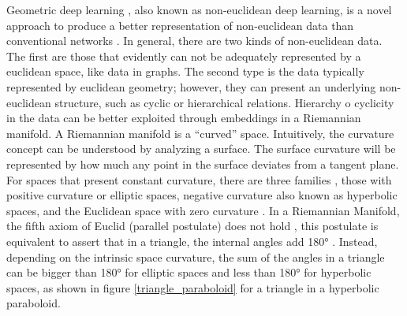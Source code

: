 \documentclass[journal]{IEEEtran}
\begin{document}
Geometric deep learning \cite{gdl}, also known as non-euclidean deep learning, is a novel approach to produce a better representation of non-euclidean data than conventional networks \cite{spherical}. In general, there are two kinds of non-euclidean data. The first are those that evidently can not be adequately represented by a euclidean space, like data in graphs. The second type is the data typically represented by euclidean geometry; however, they can present an underlying non-euclidean structure, such as cyclic or hierarchical relations. Hierarchy o cyclicity in the data can be better exploited  through embeddings in a Riemannian manifold. A Riemannian manifold is a ``curved'' space. Intuitively, the curvature concept can be understood by analyzing a surface. The surface curvature will be represented by how much any point in the surface deviates from a tangent plane. For spaces that present constant curvature, there are three families \cite{triangle}, those with positive curvature or elliptic spaces, negative curvature also known as hyperbolic spaces, and the Euclidean space with zero curvature \cite{non-euclidean-geometry}. In a Riemannian Manifold, the fifth axiom of Euclid (parallel postulate) does not hold \cite{rieman}, this postulate is equivalent to assert that in a triangle, the internal angles add 180° \cite{triangle}. Instead, depending on the intrinsic space curvature, the sum of the angles in a triangle can be bigger than 180° for elliptic spaces and less than 180° for hyperbolic spaces, as shown in figure \ref{triangle_paraboloid} for a triangle in a hyperbolic paraboloid.\newline
\end{document}
